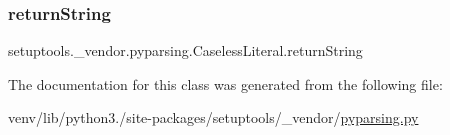 \mbox{\label{classsetuptools_1_1__vendor_1_1pyparsing_1_1CaselessLiteral_a51c2481d99a1d503a473c1c92a12ee9c}} 
\subsubsection{\texorpdfstring{return\+String}{returnString}}
{\footnotesize\ttfamily setuptools.\+\_\+vendor.\+pyparsing.\+Caseless\+Literal.\+return\+String}



The documentation for this class was generated from the following file\+:\begin{DoxyCompactItemize}
\item 
venv/lib/python3./site-\/packages/setuptools/\+\_\+vendor/\hyperlink{setuptools_2__vendor_2pyparsing_8py}{pyparsing.\+py}\end{DoxyCompactItemize}
